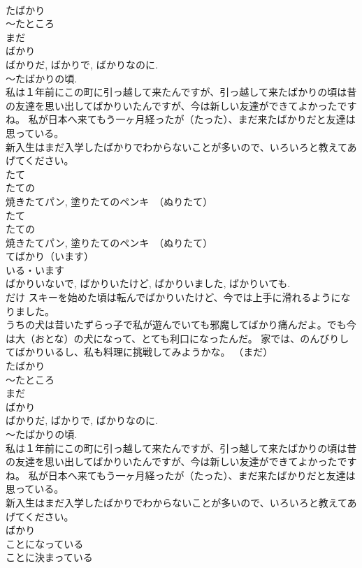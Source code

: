 \documentclass[8pt]{extreport}
\begin{document}
\begin{CJK}{UTF8}{min}
\\	たばかり 
\\	～たところ 
\\	まだ 
\\	ばかり 
\\	ばかりだ, ばかりで, ばかりなのに. 
\\	～たばかりの頃. 
\\	私は１年前にこの町に引っ越して来たんですが、引っ越して来たばかりの頃は昔の友達を思い出してばかりいたんですが、今は新しい友達ができてよかったですね。 私が日本へ来てもう一ヶ月経ったが（たった）、まだ来たばかりだと友達は思っている。 
\\	新入生はまだ入学したばかりでわからないことが多いので、いろいろと教えてあげてください。 
\\	たて 
\\	たての
\\	焼きたてパン, 塗りたてのペンキ　（ぬりたて）　
\\	たて	
\\	たての
\\	焼きたてパン, 塗りたてのペンキ　（ぬりたて） 
\\	てばかり（います） 
\\	いる・います 
\\	ばかりいないで, ばかりいたけど, ばかりいました, ばかりいても. 
\\	だけ スキーを始めた頃は転んでばかりいたけど、今では上手に滑れるようになりました。 
\\	うちの犬は昔いたずらっ子で私が遊んでいても邪魔してばかり痛んだよ。でも今は大（おとな）の犬になって、とても利口になったんだ。 家では、のんびりしてばかりいるし、私も料理に挑戦してみようかな。 （まだ）
\\	たばかり 
\\	～たところ 
\\	まだ 
\\	ばかり 
\\	ばかりだ, ばかりで, ばかりなのに. 
\\	～たばかりの頃. 
\\	私は１年前にこの町に引っ越して来たんですが、引っ越して来たばかりの頃は昔の友達を思い出してばかりいたんですが、今は新しい友達ができてよかったですね。 私が日本へ来てもう一ヶ月経ったが（たった）、まだ来たばかりだと友達は思っている。 
\\	新入生はまだ入学したばかりでわからないことが多いので、いろいろと教えてあげてください。 
\\	ばかり 
\\	ことになっている	
\\	ことに決まっている 

\end{CJK}
\end{document}
